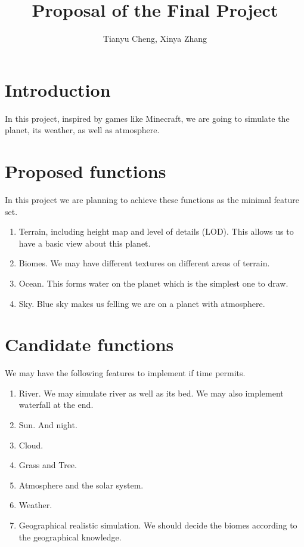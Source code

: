 \documentclass{article}
\author{Tianyu Cheng, Xinya Zhang}
\title{Proposal of the Final Project}
\begin{document}
\maketitle
\section{Introduction}

In this project, inspired by games like Minecraft, we are going to simulate
the planet, its weather, as well as atmosphere.

\section{Proposed functions}

In this project we are planning to achieve these functions as the minimal
feature set.
\begin{enumerate}
\item Terrain, including height map and level of details (LOD). This allows us
to have a basic view about this planet.
\item Biomes. We may have different textures on different areas of terrain.
\item Ocean. This forms water on the planet which is the simplest one to draw.
\item Sky. Blue sky makes us felling we are on a planet with atmosphere.
\end{enumerate}

\section{Candidate functions}
We may have the following features to implement if time permits.
\begin{enumerate}
\item River. We may simulate river as well as its bed. We may also implement
waterfall at the end.
\item Sun. And night.
\item Cloud.
\item Grass and Tree.
\item Atmosphere and the solar system.
\item Weather.
\item Geographical realistic simulation. We should decide the biomes according
to the geographical knowledge.
\end{enumerate}
\end{document}

